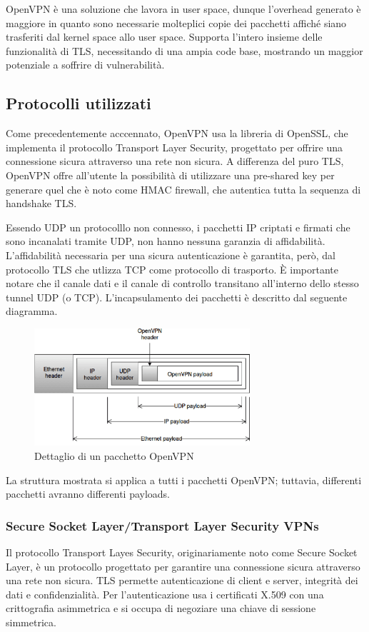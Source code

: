 OpenVPN è una soluzione che lavora in user space, dunque l'overhead generato è maggiore in quanto sono necessarie molteplici copie dei pacchetti affiché siano trasferiti dal kernel space allo user space. Supporta l'intero insieme delle funzionalità di TLS, necessitando di una ampia code base, mostrando un maggior potenziale a soffrire di vulnerabilità.

\subsection{Protocolli utilizzati}
Come precedentemente acccennato, OpenVPN usa la libreria di OpenSSL, che implementa il protocollo Transport Layer Security, progettato per offrire una connessione sicura attraverso una rete non sicura.
A differenza del puro TLS, OpenVPN offre all'utente la possibilità di utilizzare una pre-shared key per generare quel che è noto come HMAC firewall, che autentica tutta la sequenza di handshake TLS.

Essendo UDP un protocolllo non connesso, i pacchetti IP criptati e firmati che sono incanalati tramite UDP, non hanno nessuna garanzia di affidabilità. L'affidabilità necessaria per una sicura autenticazione è garantita, però, dal protocollo TLS che utlizza TCP come protocollo di trasporto.
È importante notare che il canale dati e il canale di controllo transitano all'interno dello stesso tunnel UDP (o TCP). L'incapsulamento dei pacchetti è descritto dal seguente diagramma.

\begin{figure}
    \centering
    \includegraphics[width=8cm]{figure/OVPN_packet.png}
    \caption{Dettaglio di un pacchetto OpenVPN}
\end{figure}

La struttura mostrata si applica a tutti i pacchetti OpenVPN; tuttavia, differenti pacchetti avranno differenti payloads.


\subsubsection{Secure Socket Layer/Transport Layer Security VPNs}
Il protocollo Transport Layes Security, originariamente noto come Secure Socket Layer, è un protocollo progettato per garantire una connessione sicura attraverso una rete non sicura. TLS permette autenticazione di client e server, integrità dei dati e confidenzialità. Per l'autenticazione usa i certificati X.509 \cite[RFC5280]{RFC5280} con una crittografia asimmetrica e si occupa di negoziare una chiave di sessione simmetrica.

